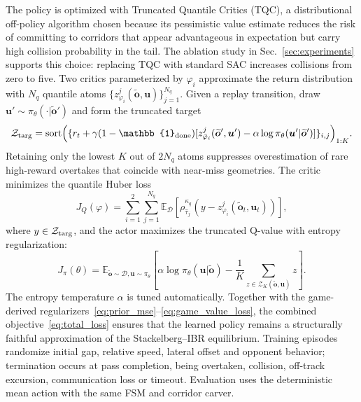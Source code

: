 \documentclass{iopjournal}
\begin{document}
The policy is optimized with Truncated Quantile Critics (TQC), a
distributional off-policy algorithm chosen because its pessimistic value
estimate reduces the risk of committing to corridors that appear advantageous
in expectation but carry high collision probability in the tail.  The ablation
study in Sec.~\ref{sec:experiments} supports this choice: replacing TQC with
standard SAC increases collisions from zero to five.  Two critics
parameterized by $\varphi_i$
approximate the return distribution with $N_q$ quantile atoms
$\{z_{\varphi_i}^{j}(\widetilde{\bm{o}},\bm{u})\}_{j=1}^{N_q}$.  Given
a replay transition, draw
$\bm{u}'\sim\pi_\theta(\cdot|\widetilde{\bm{o}}')$ and form the truncated
target
\begin{equation}
\mathcal{Z}_{\rm targ}=
\operatorname{sort}\Bigl(
\{r_t+\gamma(1-\mathbb{1}_{\rm done})
[z_{\bar\varphi_i}^{j}(\widetilde{\bm{o}}',\bm{u}')
-\alpha\log\pi_\theta(\bm{u}'|\widetilde{\bm{o}}')]\}_{i,j}
\Bigr)_{1:K}.
\label{eq:tqc_target}
\end{equation}
Retaining only the lowest $K$ out of $2N_q$ atoms suppresses
overestimation of rare high-reward overtakes that coincide with near-miss
geometries.  The critic minimizes the quantile Huber loss
\begin{equation}
J_Q(\varphi)=
\sum_{i=1}^{2}\sum_{j=1}^{N_q}
\mathbb{E}_{\mathcal D}
\left[
\rho_{\hat\tau_j}^{\kappa_q}
\left(
y-z_{\varphi_i}^{j}(\widetilde{\bm{o}}_t,\bm{u}_t)
\right)
\right],
\label{eq:tqc_critic}
\end{equation}
where $y\in\mathcal{Z}_{\rm targ}$, and the actor maximizes the truncated
Q-value with entropy regularization:
\begin{equation}
J_\pi(\theta)=
\mathbb{E}_{\widetilde{\bm{o}}\sim\mathcal D,\bm{u}\sim\pi_\theta}
\left[
\alpha\log\pi_\theta(\bm{u}|\widetilde{\bm{o}})
-\frac{1}{K}\sum_{z\in\mathcal{Z}_{K}(\widetilde{\bm{o}},\bm{u})}z
\right].
\label{eq:tqc_actor}
\end{equation}
The entropy temperature $\alpha$ is tuned automatically.
Together with the game-derived
regularizers~\eqref{eq:prior_mse}--\eqref{eq:game_value_loss}, the combined
objective~\eqref{eq:total_loss} ensures that the learned policy remains a
structurally faithful approximation of the Stackelberg--IBR equilibrium.
Training episodes
randomize initial gap, relative speed, lateral offset and opponent behavior;
termination occurs at pass completion, being overtaken, collision, off-track
excursion, communication loss or timeout.  Evaluation uses the deterministic
mean action with the same FSM and corridor carver.
\end{document}
